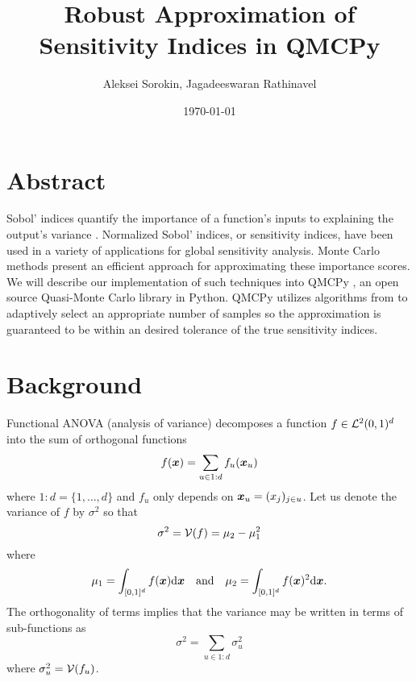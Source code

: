 \documentclass{article}
\title{Robust Approximation of Sensitivity Indices in QMCPy}
\author{Aleksei Sorokin, Jagadeeswaran Rathinavel}
\date{\today}
\begin{document}
\maketitle

\section{Abstract}

Sobol' indices quantify the importance of a function's inputs to explaining the output's variance \cite[Appendix A]{mcbook}.  Normalized Sobol' indices, or sensitivity indices, have been used in a variety of applications for global sensitivity analysis. Monte Carlo methods present an efficient approach for approximating these importance scores. We will describe our implementation of such techniques into QMCPy \cite{QMCPy}, an open source Quasi-Monte Carlo library in Python. QMCPy utilizes algorithms from \cite{reliable_sobol_indices_approx} to adaptively select an appropriate number of samples so the approximation is guaranteed to be within an desired tolerance of the true sensitivity indices. 

\section{Background}

Functional ANOVA (analysis of variance) decomposes a function $f \in \mathcal{L}^2(0,1)^d$ into the sum of orthogonal functions
\begin{equation}
    f(\boldsymbol{x}) = \sum_{u \in 1:d} f_u(\boldsymbol{x}_u)
\end{equation}
\cite[Appendix A]{mcbook} where $1:d = \{1,\dots,d\}$ and $f_u$ only depends on $\boldsymbol{x}_u = (x_j)_{j \in u}$. Let us denote the variance of $f$ by $\sigma^2$ so that 
\begin{equation}
    \sigma^2 = \mathcal{V}(f) = \mu_2 - \mu_1^2
\end{equation}
where
\begin{equation}
    \mu_1 = \int_{[0,1]^d}f(\boldsymbol{x})\mathrm{d}\boldsymbol{x} \quad \text{and} \quad \mu_2 = \int_{[0,1]^d} f(\boldsymbol{x})^2 \mathrm{d} \boldsymbol{x}.
\end{equation} 
The orthogonality of terms implies that the variance may be written in terms of sub-functions as
\begin{equation}
    \sigma^2 = \sum_{u \in 1:d} \sigma^2_u
\end{equation}
where $\sigma_u^2 = \mathcal{V}(f_u)$. 
\end{document}
